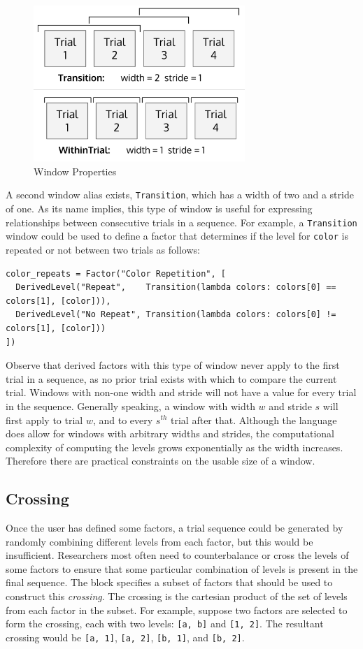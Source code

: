 \begin{figure}[htb]
\centering
\centerline{\includegraphics[origin=c,width=8cm]{../figures/windows.png}}
\caption{Window Properties}
\label{fig:windows}
\end{figure}

A second window alias exists, \texttt{Transition}, which has a width of two and a stride of one. As its name implies, this type of window is useful for expressing relationships between consecutive trials in a sequence. For example, a \texttt{Transition} window could be used to define a factor that determines if the level for \texttt{color} is repeated or not between two trials as follows:

\begin{verbatim}
color_repeats = Factor("Color Repetition", [
  DerivedLevel("Repeat",    Transition(lambda colors: colors[0] == colors[1], [color])),
  DerivedLevel("No Repeat", Transition(lambda colors: colors[0] != colors[1], [color]))
])
\end{verbatim}

Observe that derived factors with this type of window never apply to the first trial in a sequence, as no prior trial exists with which to compare the current trial. Windows with non-one width and stride will not have a value for every trial in the sequence. Generally speaking, a window with width $w$ and stride $s$ will first apply to trial $w$, and to every $s^{th}$ trial after that. Although the language does allow for windows with arbitrary widths and strides, the computational complexity of computing the levels grows exponentially as the width increases. Therefore there are practical constraints on the usable size of a window.

\subsection{Crossing}

Once the user has defined some factors, a trial sequence could be generated by randomly combining different levels from each factor, but this would be insufficient. Researchers most often need to counterbalance or cross the levels of some factors to ensure that some particular combination of levels is present in the final sequence. The block specifies a subset of factors that should be used to construct this \textit{crossing}. The crossing is the cartesian product of the set of levels from each factor in the subset. For example, suppose two factors are selected to form the crossing, each with two levels: \texttt{[a, b]} and \texttt{[1, 2]}. The resultant crossing would be \texttt{[a, 1]}, \texttt{[a, 2]}, \texttt{[b, 1]}, and \texttt{[b, 2]}.

